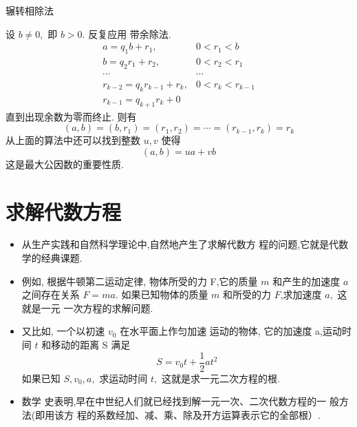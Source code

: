 \documentclass[10pt,punct]{ctexbeamer}
\newtheorem*{conj}{猜想}
\begin{document}
\begin{frame}{辗转相除法}

    设 $b \neq 0,$ 即 $b>0 .$ 反复应用 带余除法.
    \[
    \begin{array}{cc}
        a=q_{1} b+r_{1}, & 0<r_{1}<b \\
        b=q_{2} r_{1}+r_{2}, & 0<r_{2}<r_{1} \\
        \cdots  & \cdots  \\
        r_{k-2}=q_{k} r_{k-1}+r_{k}, & 0<r_{k}<r_{k-1} \\
        r_{k-1}=q_{k+1} r_{k}+0
    \end{array}
    \]
    直到出现余数为零而终止. 则有
    \[
    (a, b)=\left(b, r_{1}\right)=\left(r_{1}, r_{2}\right)=\cdots=\left(r_{k-1}, r_{k}\right)=r_{k}
    \]
    从上面的算法中还可以找到整数 $u, v$ 使得
    \[
    (a, b)=u a+v b
    \]
    这是最大公因数的重要性质.


\end{frame}






\section{求解代数方程}
%
%
%
%


\begin{frame}
\begin{itemize}
\item 从生产实践和自然科学理论中,自然地产生了\alert{求解代数方
程}的问题,它就是代数学的经典课题.
\item
例如, 根据牛顿第二运动定律,  物体所受的力 F,它的质量 $m$ 和产生的加速度 $a$ 之间存在关系 $F= ma$.
如果已知物体的质量 $m$ 和所受的力 $F$,求加速度 $a,$ 这就是\alert{一元 一次方程}的求解问题.
\item  又比如, 一个以初速 $v_{0}$ 在水平面上作匀加速 运动的物体, 它的加速度 a,运动时间 $t$ 和移动的距离 S 满足
\[
S=v_{0} t+\frac{1}{2} a t^{2}
\]
如果已知 $S, v_{0}, a,$ 求运动时间 $t,$ 这就是求\alert{一元二次方程}的根.
\end{itemize}

\pause

\begin{itemize}
    \item 数学 史表明,早在中世纪人们就已经找到解一元一次、二次代数方程的一 般方法(即用该方 程的系数经加、减、乘、除及开方运算表示它的全部根）.

\end{itemize}

\end{frame}
\end{document}
